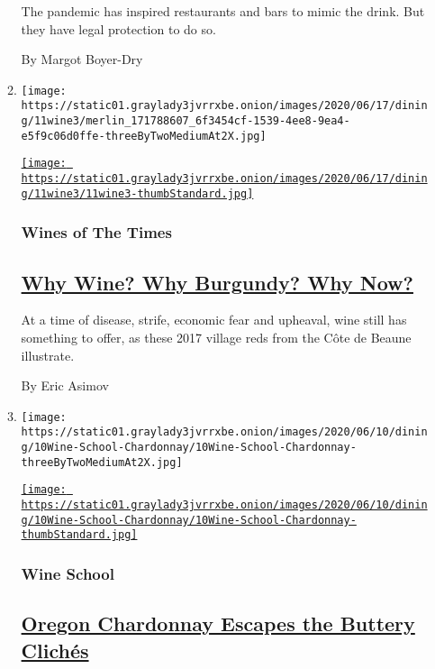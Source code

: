 \begin{enumerate}
\begin{enumerate}
    The pandemic has inspired restaurants and bars to mimic the drink.
    But they have legal protection to do so.

    By Margot Boyer-Dry
  \item
    \texttt{[image: https://static01.graylady3jvrrxbe.onion/images/2020/06/17/dining/11wine3/merlin\_171788607\_6f3454cf-1539-4ee8-9ea4-e5f9c06d0ffe-threeByTwoMediumAt2X.jpg]}

    \href{/2020/06/11/dining/drinks/wine-review-cote-de-beaune-villages-red.html}{\texttt{[image: https://static01.graylady3jvrrxbe.onion/images/2020/06/17/dining/11wine3/11wine3-thumbStandard.jpg]}}

    \hypertarget{wines-of-the-times}{%
    \subsubsection{Wines of The Times}\label{wines-of-the-times}}

    \hypertarget{why-wine-why-burgundy-why-now}{%
    \subsection{\texorpdfstring{\href{/2020/06/11/dining/drinks/wine-review-cote-de-beaune-villages-red.html}{Why
    Wine? Why Burgundy? Why
    Now?}}{Why Wine? Why Burgundy? Why Now?}}\label{why-wine-why-burgundy-why-now}}

    At a time of disease, strife, economic fear and upheaval, wine still
    has something to offer, as these 2017 village reds from the Côte de
    Beaune illustrate.

    By Eric Asimov
  \item
    \texttt{[image: https://static01.graylady3jvrrxbe.onion/images/2020/06/10/dining/10Wine-School-Chardonnay/10Wine-School-Chardonnay-threeByTwoMediumAt2X.jpg]}

    \href{/2020/06/04/dining/drinks/wine-school-chardonnay-oregon.html}{\texttt{[image: https://static01.graylady3jvrrxbe.onion/images/2020/06/10/dining/10Wine-School-Chardonnay/10Wine-School-Chardonnay-thumbStandard.jpg]}}

    \hypertarget{wine-school}{%
    \subsubsection{Wine School}\label{wine-school}}

    \hypertarget{oregon-chardonnay-escapes-the-buttery-clichuxe9s}{%
    \subsection{\texorpdfstring{\href{/2020/06/04/dining/drinks/wine-school-chardonnay-oregon.html}{Oregon
    Chardonnay Escapes the Buttery
    Clichés}}{Oregon Chardonnay Escapes the Buttery Clichés}}\label{oregon-chardonnay-escapes-the-buttery-clichuxe9s}}


\end{enumerate}
\end{enumerate}
